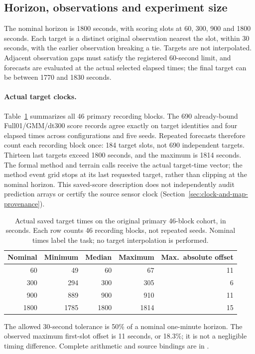 \documentclass[11pt]{article}
\begin{document}
\subsection{Horizon, observations and experiment size}
\label{sec:inventory}
The nominal horizon is 1800 seconds, with scoring slots at 60, 300, 900 and
1800 seconds. Each target is a distinct original observation nearest the
slot, within 30 seconds, with the earlier observation breaking a tie.
Targets are not interpolated. Adjacent observation gaps must satisfy the
registered 60-second limit, and forecasts are evaluated at the actual selected
elapsed times; the final target can be between 1770 and 1830 seconds.

\paragraph{Actual target clocks.}\label{sec:target-times}
Table~\ref{tab:actual-target-times} summarizes all 46 primary recording blocks.
The 690 already-bound Full01/GMM/dt300 score records agree exactly on target
identities and four elapsed times across configurations and five seeds.
Repeated forecasts therefore count each recording block once: 184 target
slots, not 690 independent targets. Thirteen last targets exceed 1800 seconds,
and the maximum is 1814 seconds. The formal method and terrain calls receive
the actual target-time vector; the method event grid stops at its last
requested target, rather than clipping at the nominal horizon.
This saved-score description does not independently audit prediction arrays
or certify the source sensor clock (Section~\ref{sec:clock-and-map-provenance}).

\begin{table}[htbp]
\centering\small
\caption{Actual saved target times on the original primary 46-block cohort,
in seconds. Each row counts 46 recording blocks, not repeated seeds.
Nominal times label the task; no target interpolation is performed.}
\label{tab:actual-target-times}
\begin{tabular}{@{}rrrrr@{}}
\toprule
Nominal & Minimum & Median & Maximum & Max.\ absolute offset\\
\midrule
60 & 49 & 60 & 67 & 11\\
300 & 294 & 300 & 305 & 6\\
900 & 889 & 900 & 910 & 11\\
1800 & 1785 & 1800 & 1814 & 15\\
\bottomrule
\end{tabular}
\end{table}
The allowed 30-second tolerance is 50\% of a nominal one-minute horizon.
The observed maximum first-slot offset is 11 seconds, or 18.3\%;
it is not a negligible timing difference. Complete arithmetic and source
bindings are in .
\end{document}
